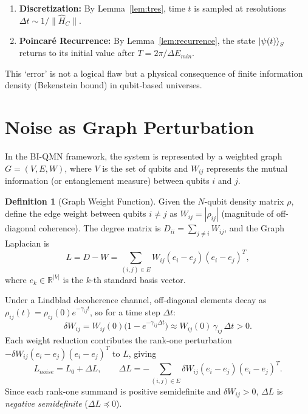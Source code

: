 \documentclass[11pt,a4paper]{article}
\theoremstyle{definition}
\newtheorem{definition}[theorem]{Definition}
\theoremstyle{remark}
\begin{document}
\begin{enumerate}
  \item \textbf{Discretization:} By Lemma~\ref{lem:tres}, time $t$ is sampled at resolutions
        $\Delta t\sim 1/\|\hat{H}_C\|$.
  \item \textbf{Poincar\'e Recurrence:} By Lemma~\ref{lem:recurrence},
        the state $\ket{\psi(t)}_S$ returns to its initial value after $T=2\pi/\Delta E_{min}$.
\end{enumerate}
This `error' is not a logical flaw but a physical consequence of finite information density
(Bekenstein bound) in qubit-based universes.

\section{Noise as Graph Perturbation}

In the BI-QMN framework, the system is represented by a weighted graph $G=(V,E,W)$, where
$V$ is the set of qubits and $W_{ij}$ represents the mutual information (or entanglement
measure) between qubits $i$ and $j$.

\begin{definition}[Graph Weight Function]\label{def:weight}
Given the $N$-qubit density matrix $\rho$, define the edge weight between qubits $i\neq j$
as $W_{ij}=|\rho_{ij}|$ (magnitude of off-diagonal coherence).
The degree matrix is $D_{ii}=\sum_{j\neq i}W_{ij}$, and the Graph Laplacian is
\begin{equation}\label{eq:lap}
  L = D-W
    = \sum_{(i,j)\in E}W_{ij}(e_i-e_j)(e_i-e_j)^T,
\end{equation}
where $e_k\in\mathbb{R}^{|V|}$ is the $k$-th standard basis vector.
\end{definition}

Under a Lindblad decoherence channel, off-diagonal elements decay as
$\rho_{ij}(t)=\rho_{ij}(0)e^{-\gamma_{ij}t}$, so for a time step $\Delta t$:
\[
  \delta W_{ij}
    = W_{ij}(0)\bigl(1-e^{-\gamma_{ij}\Delta t}\bigr)
    \approx W_{ij}(0)\,\gamma_{ij}\,\Delta t > 0.
\]
Each weight reduction contributes the rank-one perturbation
$-\delta W_{ij}(e_i-e_j)(e_i-e_j)^T$ to $L$, giving
\begin{equation}\label{eq:Lnoise}
  L_{noise} = L_0 + \Delta L, \qquad
  \Delta L = -\sum_{(i,j)\in E}\delta W_{ij}(e_i-e_j)(e_i-e_j)^T.
\end{equation}
Since each rank-one summand is positive semidefinite and $\delta W_{ij}>0$,
$\Delta L$ is \emph{negative semidefinite} ($\Delta L\preceq 0$).
\end{document}
